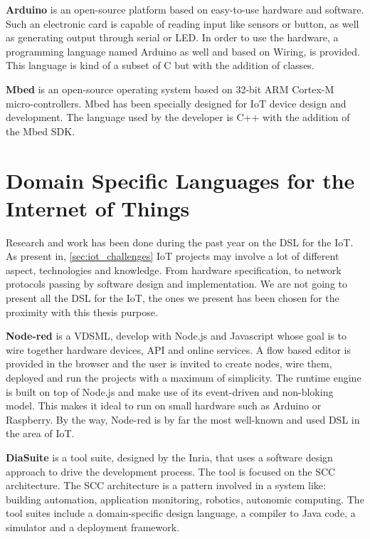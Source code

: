 \textbf{Arduino} is an open-source platform based on easy-to-use hardware and
software\cite{Arduino2017}. Such an electronic card is capable of reading input
like sensors or button, as well as generating output through serial or LED. In
order to use the hardware, a programming language named Arduino as well and
based on Wiring\cite{Arduino2017}, is provided. This language is kind of a
subset of C but with the addition of classes.

\textbf{Mbed} is an open-source operating system based on 32-bit ARM Cortex-M
micro-control\-lers\cite{Toulson:2012:FEE:2385440}. Mbed has been specially designed
for \gls{IoT} device design and development. The language used by the developer
is C++ with the addition of the Mbed SDK\cite{Toulson:2012:FEE:2385440}.

\section{Domain Specific Languages for the Internet of Things}
\label{sec:dsl_for_iot}

Research and work has been done during the past year on the \gls{DSL} for the
\gls{IoT}. As present in, \ref{sec:iot_challenges} \gls{IoT} projects may
involve a lot of different aspect, technologies and knowledge. From hardware
specification, to network protocols passing by software design and
implementation. We are not going to present all the \gls{DSL} for the \gls{IoT},
the ones we present has been chosen for the proximity with this thesis purpose.

\textbf{Node-red} is a \gls{VDSML}, develop with Node.js and
Javascript whose goal is to wire together hardware devices, API and online
services. \cite{node-red} A flow based editor is provided in the browser and
the user is invited to create nodes, wire them, deployed and run the projects
with a maximum of simplicity\cite{Salihbegovic2015}. The runtime engine is built
on top of Node.js and make use of its event-driven and non-bloking model. This
makes it ideal to run on small hardware such as Arduino or
Raspberry\cite{node-red}. By the way, Node-red is by far the most well-known and
used \gls{DSL} in the area of \gls{IoT}.

\textbf{DiaSuite} is a tool suite, designed by the Inria, that uses a
software design approach to drive the development process\cite{Bertran2012}.
The tool is focused on the \gls{SCC} architecture. The \gls{SCC} architecture is
a pattern involved in a system like: building automation, application monitoring,
robotics, autonomic computing\cite{Taylor:2009:SAF:1538494}. The tool suites
include a domain-specific design language, a compiler to Java code, a simulator
and a deployment framework. 

